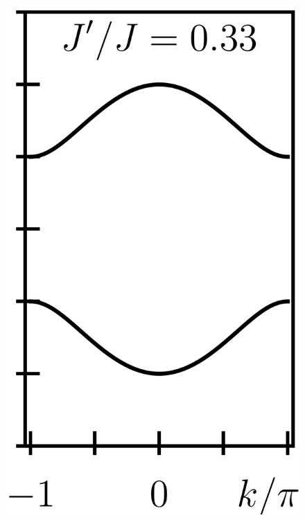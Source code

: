 \documentclass{svmono}
\begin{document}
\begin{figure}[ht]
    \includegraphics{figures/cropped_ssh_dispersion_1.png}

\end{figure}
\end{document}

